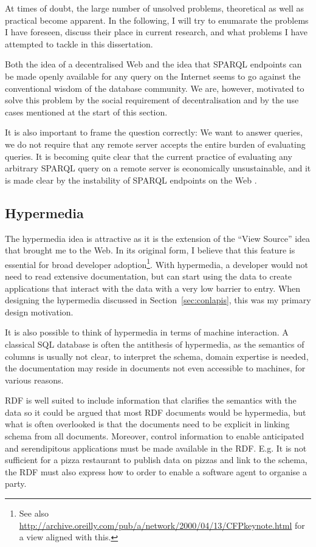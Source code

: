 At times of doubt, the large number of unsolved problems, theoretical
as well as practical become apparent. In the following, I will try to
enumarate the problems I have foreseen, discuss their place in current
research, and what problems I have attempted to tackle in this
dissertation.

Both the idea of a decentralised Web and the idea that SPARQL
endpoints can be made openly available for any query on the Internet
seems to go against the conventional wisdom of the database
community. We are, however, motivated to solve this problem by the
social requirement of decentralisation and by the use cases mentioned
at the start of this section.

It is also important to frame the question correctly: We want to
answer queries, we do not require that any remote server accepts the
entire burden of evaluating queries. It is becoming quite clear that
the current practice of evaluating any arbitrary SPARQL query on a
remote server is economically unsustainable, and it is made clear by
the instability of SPARQL endpoints on the Web \cite{buil2013sparql}.

\subsection{Hypermedia}

The hypermedia idea is attractive as it is the extension of the ``View
Source'' idea that brought me to the Web. In its original form, I
believe that this feature is essential for broad developer
adoption\footnote{See also
  \url{http://archive.oreilly.com/pub/a/network/2000/04/13/CFPkeynote.html}
  for a view aligned with this.}. With hypermedia, a developer would
not need to read extensive documentation, but can start using the data
to create applications that interact with the data with a very low
barrier to entry. When designing the hypermedia discussed in
Section~\ref{sec:conlapis}, this was my primary design motivation. 

It is also possible to think of hypermedia in terms of machine
interaction. A classical SQL database is often the antithesis of
hypermedia, as the semantics of columns is usually not clear, to
interpret the schema, domain expertise is needed, the documentation
may reside in documents not even accessible to machines, for various
reasons.

RDF is well suited to include information that clarifies the semantics
with the data so it could be argued that most RDF documents would be
hypermedia, but what is often overlooked is that the documents need to
be explicit in linking schema from all documents. Moreover, control
information to enable anticipated and serendipitous applications must
be made available in the RDF. E.g. It is not sufficient for a pizza
restaurant to publish data on pizzas and link to the schema, the RDF
must also express how to order to enable a software agent to organise
a party.

